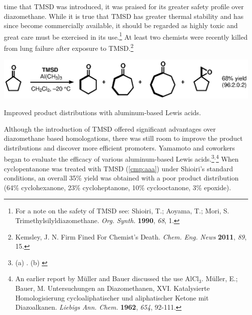 time that TMSD was introduced, it was praised for its greater safety profile over diazomethane.
While it is true that TMSD has greater thermal
 stability and has since become commercially available, it should be regarded as highly toxic and
 great care must be exercised in its use.\footnote{For a note on the safety of TMSD see:
 {\frenchspacing Shioiri, T.; Aoyama, T.; Mori, S. Trimethylsilyldiazomethane. \textit{Org. Synth.}
 \textbf{1990}, \textit{68}, 1.}} At least two chemists were recently killed from lung failure after
 exposure to TMSD.\footnote{{\frenchspacing Kemsley, J. N. Firm Fined For Chemist's Death.
 \textit{Chem. Eng. News} \textbf{2011}, \textit{89}, 15.}}

\begin{Scheme}[b]
  \centering \includegraphics[scale=0.8]{chp_diazobkg/images/yamamotoone}
  \caption{Improved product distributions with aluminum-based Lewis acids.}
  \label{sch:yamamotoone}
\end{Scheme}
Although the introduction of TMSD offered significant advantages over diazomethane based
homologations, there was still room to improve the product
distributions and discover more efficient promoters.
Yamamoto and
coworkers began to evaluate the efficacy of various aluminum-based Lewis acids.\footnote{(a)
. (b)  \label{ref:yamamoto}}$^,$\footnote{An earlier
report by M\"uller and Bauer discussed the use AlCl$_3$. {\frenchspacing M\"uller, E.; Bauer, M.
Untersuchungen an Diazomethanen, XVI. Katalysierte Homologisierung cycloaliphatischer und
aliphatischer Ketone mit Diazoalkanen. \textit{Liebigs Ann. Chem.} \textbf{1962}, \textit{654}, 92-111.}} When cyclopentanone was treated with TMSD (\ref{cmp:aaa}) under Shioiri's standard conditions, an overall 35\% yield was obtained with a poor product distribution (64\% cyclohexanone, 23\% cycloheptanone, 10\% cyclooctanone, 3\% epoxide).
